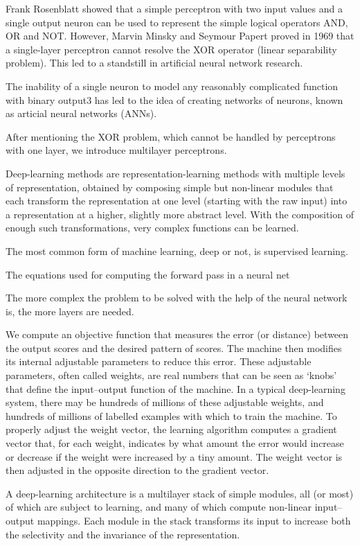 Frank Rosenblatt showed that a simple perceptron with two input values and a single output neuron can be used to represent the simple logical operators AND, OR and NOT. However, Marvin Minsky and Seymour Papert proved in 1969 that a single-layer perceptron cannot resolve the XOR operator (linear separability problem). This led to a standstill in artificial neural network research.

The inability of a single neuron to model any reasonably complicated function with binary output3
has led to the idea of creating networks of neurons, known as articial neural networks (ANNs).

After mentioning the XOR problem, which cannot be handled by perceptrons with one layer, we introduce multilayer perceptrons. 


Deep-learning methods are representation-learning methods with multiple levels of representation, obtained by composing simple but non-linear modules that each transform the representation at one level (starting with the raw input) into a representation at a higher, slightly more abstract level. With the composition of enough such transformations, very complex functions can be learned.

The most common form of machine learning, deep or not, is supervised learning.

The equations used for computing the forward pass in a neural net



The more complex the problem to be solved with the help of the neural network is, the more layers are needed. 

We compute an objective function that measures the error (or distance) between the output scores and the desired pattern of scores. The machine then modifies its internal adjustable parameters to reduce  this error. These adjustable parameters, often called weights, are real numbers that can be seen as ‘knobs’ that define the input–output function of the machine. In a typical deep-learning system, there may be hundreds of millions of these adjustable weights, and hundreds of millions of labelled examples with which to train the machine. To properly adjust the weight vector, the learning algorithm computes a gradient vector that, for each weight, indicates by what amount the error would increase or decrease if the weight were increased by a tiny amount. The weight vector is then adjusted in the opposite direction to the gradient vector. 

A deep-learning architecture is a multilayer stack of simple modules, all (or most) of which are subject to learning, and many of which compute non-linear input–output mappings. Each module in the stack transforms its input to increase both the selectivity and the invariance of the representation.

